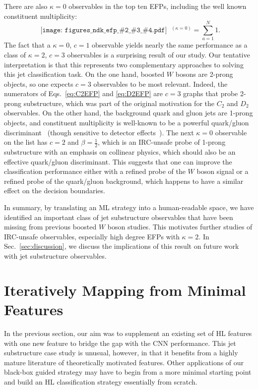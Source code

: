 \documentclass[aps,prd,twocolumn,superscriptaddress,preprintnumbers,nofootinbib,longbibliography,floatfix]{revtex4-1}
\newcommand{\Sec}[1]{Sec.~\ref{#1}}
\newcommand{\Eqs}[2]{Eqs.~\eqref{#1} and \eqref{#2}}
\newcommand{\ndk}[4]{
	\begin{gathered}\texttt{[image: figures\_ndk\_efp\_\#2\_\#3\_\#4.pdf]}\end{gathered}
}
\begin{document}
There are also $\kappa = 0$ observables in the top ten EFPs, including the well known constituent multiplicity:
\begin{equation}
	\ndk{0.045}{1}{0}{0}\ \!\!\!\!\!{}^{(\kappa = 0)} = \sum_{a = 1}^N 1 \label{eq:multiplicity}.
\end{equation}
The fact that a $\kappa = 0$, $c = 1$ observable yields nearly the same performance as a class of $\kappa = 2$, $c = 3$ observables is a surprising result of our study. Our tentative interpretation is that this represents two complementary approaches to solving this jet classification task. On the one hand, boosted $W$ bosons are 2-prong objects, so one expects $c = 3$ observables to be most relevant. Indeed, the numerators of \Eqs{eq:C2EFP}{eq:D2EFP} are $c=3$ graphs that probe 2-prong substructure, which was part of the original motivation for the $C_2$ and $D_2$ observables. On the other hand, the background quark and gluon jets are 1-prong objects, and constituent multiplicity is well-known to be a powerful quark/gluon discriminant~\cite{Gras:2017jty} (though sensitive to detector effects~\cite{Kasieczka:2018lwf}). The next $\kappa = 0$ observable on the list has $c = 2$ and $\beta = \frac{1}{2}$, which is an IRC-unsafe probe of 1-prong substructure with an emphasis on collinear physics, which should also be an effective quark/gluon discriminant. This suggests that one can improve the classification performance either with a refined probe of the $W$ boson signal or a refined probe of the quark/gluon background, which happens to have a similar effect on the decision boundaries.

In summary, by translating an ML strategy into a human-readable space, we have identified an important class of jet substructure observables that have been missing from previous boosted $W$ boson studies. This motivates further studies of IRC-unsafe observables, especially high degree EFPs with $\kappa = 2$. In \Sec{sec:discussion}, we discuss the implications of this result on future work with jet substructure observables.

\section{Iteratively Mapping from Minimal Features}
\label{sec:iteratively}
In the previous section, our aim was to supplement an existing set of HL features with one new feature to bridge the gap with the CNN performance. This jet substructure case study is unusual, however, in that it benefits from a highly mature literature of theoretically motivated features. Other applications of our black-box guided strategy may have to begin from a more minimal starting point and build an HL classification strategy essentially from scratch.
\end{document}
